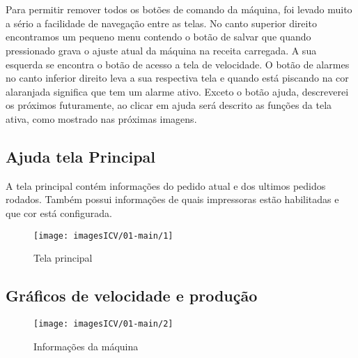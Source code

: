 \usepackage{graphicx}\thispagestyle{fancy}

\vspace{\fill}


\section{}

Para permitir remover todos os botões de comando da máquina, foi levado muito a sério a facilidade de navegação entre as telas.
No canto superior direito encontramos um pequeno menu contendo o botão de salvar que quando pressionado grava o ajuste atual da
máquina na receita carregada. A sua esquerda se encontra o botão de acesso a tela de velocidade.
O botão de alarmes no canto inferior direito leva a sua respectiva tela e quando está piscando na cor alaranjada significa
que tem um alarme ativo. Exceto o botão ajuda, descreverei os próximos futuramente, ao clicar em ajuda será descrito as
funções da tela ativa, como mostrado nas próximas imagens.

\subsection{Ajuda tela Principal}
A tela principal contém informações do pedido atual e dos ultimos pedidos rodados. Também
possui informações de quais impressoras estão habilitadas e que cor está configurada.

\begin{figure}
    \centering
    \texttt{[image: imagesICV/01-main/1]}
    \caption{Tela principal}
    \label{fig:}
\end{figure}

\newpage
\thispagestyle{fancy}
\vspace{\fill}

\subsection{\small{Gráficos de velocidade e produção}}

\begin{figure}
    \centering
    \texttt{[image: imagesICV/01-main/2]}
    \caption{Informações da máquina}
    \label{fig:}
\end{figure}

\newpage
\thispagestyle{fancy}
\vspace{\fill}


